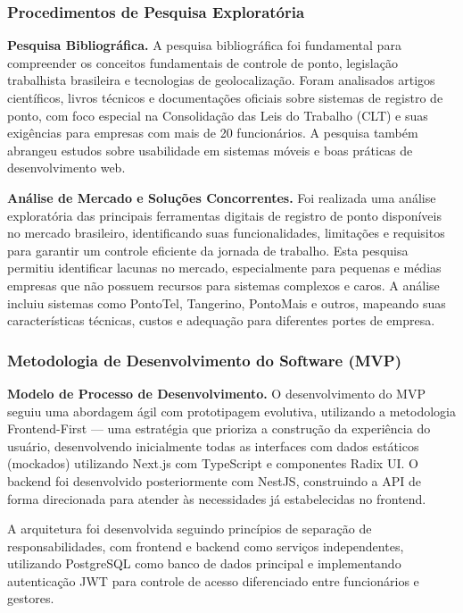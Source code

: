 \subsubsection{Procedimentos de Pesquisa Exploratória}

\textbf{Pesquisa Bibliográfica.} A pesquisa bibliográfica foi fundamental para compreender os conceitos fundamentais de controle de ponto, legislação trabalhista brasileira e tecnologias de geolocalização. Foram analisados artigos científicos, livros técnicos e documentações oficiais sobre sistemas de registro de ponto, com foco especial na Consolidação das Leis do Trabalho (CLT) e suas exigências para empresas com mais de 20 funcionários. A pesquisa também abrangeu estudos sobre usabilidade em sistemas móveis e boas práticas de desenvolvimento web.

\textbf{Análise de Mercado e Soluções Concorrentes.} Foi realizada uma análise exploratória das principais ferramentas digitais de registro de ponto disponíveis no mercado brasileiro, identificando suas funcionalidades, limitações e requisitos para garantir um controle eficiente da jornada de trabalho. Esta pesquisa permitiu identificar lacunas no mercado, especialmente para pequenas e médias empresas que não possuem recursos para sistemas complexos e caros. A análise incluiu sistemas como PontoTel, Tangerino, PontoMais e outros, mapeando suas características técnicas, custos e adequação para diferentes portes de empresa.

\subsubsection{Metodologia de Desenvolvimento do Software (MVP)}

\textbf{Modelo de Processo de Desenvolvimento.} O desenvolvimento do MVP seguiu uma abordagem ágil com prototipagem evolutiva, utilizando a metodologia Frontend-First — uma estratégia que prioriza a construção da experiência do usuário, desenvolvendo inicialmente todas as interfaces com dados estáticos (mockados) utilizando Next.js com TypeScript e componentes Radix UI. O backend foi desenvolvido posteriormente com NestJS, construindo a API de forma direcionada para atender às necessidades já estabelecidas no frontend.

A arquitetura foi desenvolvida seguindo princípios de separação de responsabilidades, com frontend e backend como serviços independentes, utilizando PostgreSQL como banco de dados principal e implementando autenticação JWT para controle de acesso diferenciado entre funcionários e gestores.

